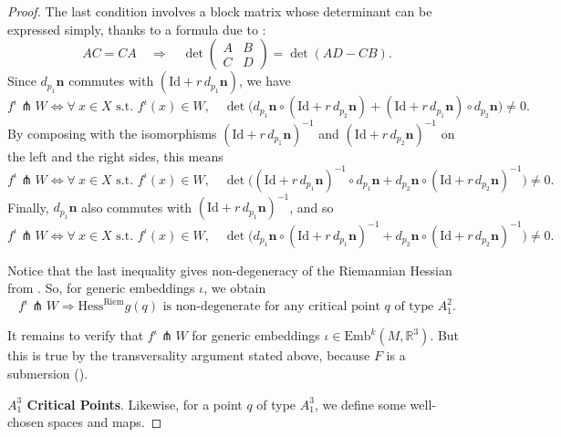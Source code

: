 \documentclass[11pt]{article}
\newcommand{\R}{\mathbb{R}}
\newcommand{\io}{\iota}
\newcommand{\nbf}{\mathbf{n}}
\newcommand{\Emb}{\mathrm{Emb}^k(M,\R^3)}
\newcommand{\Hess}{\mathrm{Hess}}
\newcommand{\Id}{\mathrm{Id}}
\theoremstyle{plain}
\theoremstyle{definition}
\theoremstyle{remark}
\begin{document}
\begin{proof}
		The last condition involves a block matrix whose determinant can be expressed simply, thanks to a formula due to \cite{silvester_determinants_2000}:
		\[AC = CA \quad \Rightarrow \quad \det 
		\begin{pmatrix}
			A & B \\
			C & D
		\end{pmatrix} = \det(AD - CB).\]
		Since $d_{p_1} \nbf$ commutes with $(\Id + r \, d_{p_1} \nbf)$, we have
		\[f^\io \pitchfork W \Leftrightarrow \forall\ x \in X \text{ s.t. } f^\io(x) \in W, \quad \det \big(d_{p_1} \nbf \circ (\Id + r \, d_{p_2} \nbf) + (\Id + r \, d_{p_1} \nbf) \circ d_{p_2} \nbf \big) \neq 0.\]
		By composing with the isomorphisms $(\Id + r \, d_{p_1} \nbf)^{-1}$ and $(\Id + r \, d_{p_2} \nbf)^{-1}$ on the left and the right sides, this means
		\[f^\io \pitchfork W 
		\Leftrightarrow \forall\ x \in X \text{ s.t. } f^\io(x) \in W, \quad \det \big((\Id + r \, d_{p_1} \nbf)^{-1} \circ d_{p_1} \nbf +  d_{p_2} \nbf \circ (\Id + r \, d_{p_2} \nbf)^{-1} \big) \neq 0.\]
		Finally, $d_{p_1} \nbf$ also commutes with $(\Id + r \, d_{p_1} \nbf)^{-1}$, and so
		\[f^\io \pitchfork W \Leftrightarrow \forall\ x \in X \text{ s.t. } f^\io(x) \in W, \quad \det \big( d_{p_1} \nbf \circ (\Id + r \, d_{p_1} \nbf)^{-1} + d_{p_2} \nbf \circ (\Id + r \, d_{p_2} \nbf)^{-1} \big) \neq 0.\]
		
		
		Notice that the last inequality gives non-degeneracy of the Riemannian Hessian from . So, for generic embeddings $\io$, we obtain
		\[f^\io \pitchfork W \Rightarrow \Hess^\mathrm{Riem} g(q) \text{ is non-degenerate for any critical point } q \text{ of type } A_1^2. \]
		
		It remains to verify that $f^\io \pitchfork W$ for generic embeddings $\io \in \Emb$. But this is true by the transversality argument stated above, because $F$ is a submersion ().
		
		
		\textbf{$A_1^3$ Critical Points}. Likewise, for a point $q$ of type $A_1^3$, we define some well-chosen spaces and maps.
		

\end{proof}
\end{document}
